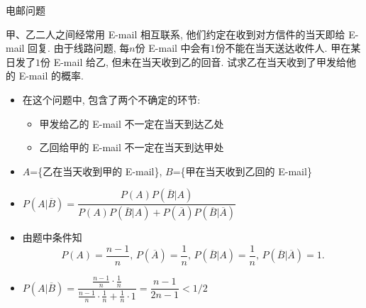 \begin{frame}{电邮问题}
	\vspace{-0.2cm}
	\begin{exam}
		甲、乙二人之间经常用 E-mail 相互联系, 他们约定在收到对方信件的当天即给 E-mail 回复. 由于线路问题, 每$n$份 E-mail 中会有$1$份不能在当天送达收件人. 甲在某日发了$1$份 E-mail 给乙, 但未在当天收到乙的回音. 试求乙在当天收到了甲发给他的 E-mail 的概率.
	\end{exam}
	\pause

	\begin{jieda}
		\begin{itemize}[<+-|alert@+>]
			\item 在这个问题中, 包含了两个不确定的环节:
			\begin{itemize}[<+-|alert@+>]
				\item 甲发给乙的 E-mail 不一定在当天到达乙处
				\item 乙回给甲的 E-mail 不一定在当天到达甲处
			\end{itemize}
			\item $A$=\{乙在当天收到甲的 E-mail\}, $B$=\{甲在当天收到乙回的 E-mail\}
			\item $P(A|\overline{B})=\dfrac{P(A)P(\overline{B}|A)}{P(A)P(\overline{B}|A)+P(\overline{A})P(\overline{B}|\overline{A})}$
			\item %
			由题中条件知
			$$P(A)=\frac{n-1}{n},\, P(\overline{A})=\frac{1}{n}, \,P(\overline{B}|A)=\frac{1}{n},\,P(\overline{B}|\overline{A})=1.$$
			\item $P(A|\overline{B})=\dfrac{\frac{n-1}{n}·\frac{1}{n}}{\frac{n-1}{n}·\frac{1}{n}+\frac{1}{n}·1}=\dfrac{n-1}{2n-1}<1/2$
		\end{itemize}
	\end{jieda}
\end{frame}
